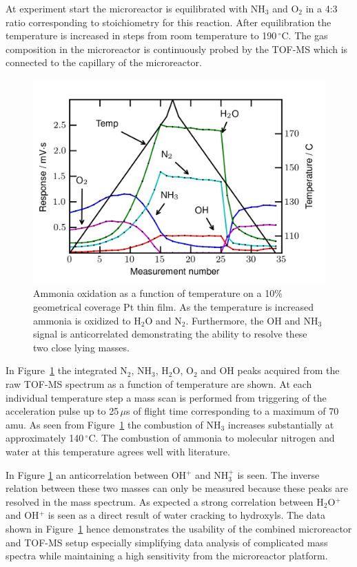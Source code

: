 \documentclass[aip,rsi]{revtex4-1}
\begin{document}
At experiment start the microreactor is equilibrated with NH$_3$ and O$_2$ in a 4:3 ratio corresponding to stoichiometry for this reaction. After equilibration the temperature is increased in steps from room temperature to 190\,$^{\circ}$C. The gas composition in the microreactor is continuously probed by the TOF-MS which is connected to the capillary of the microreactor.
\begin{figure}
 \includegraphics[width=14cm]{ammonia_reactivity.png}%
 \caption{Ammonia oxidation as a function of temperature on a 10\% geometrical coverage Pt thin film. As the temperature is increased ammonia is oxidized to H$_2$O and N$_2$. Furthermore, the OH and NH$_3$ signal is anticorrelated demonstrating the ability to resolve these two close lying masses.\label{fig:ammonia_reactivity}}%
\end{figure}
In Figure~\ref{fig:ammonia_reactivity} the integrated N$_2$, NH$_3$, H$_2$O, O$_2$ and OH peaks acquired from the raw TOF-MS spectrum as a function of temperature are shown. At each individual temperature step a mass scan is performed from triggering of the acceleration pulse up to 25\,$\mu$s of flight time corresponding to a maximum of 70 amu. As seen from Figure~\ref{fig:ammonia_reactivity} the combustion of NH$_3$ increases substantially at approximately 140\,$^{\circ}$C. The combustion of ammonia to molecular nitrogen and water at this temperature agrees well with literature\cite{Imbihl2007,Zeng2009}. 

In Figure \ref{fig:ammonia_reactivity} an anticorrelation between OH$^{+}$ and NH$_3^+$ is seen. The inverse relation between these two masses can only be measured because these peaks are resolved in the mass spectrum. As expected a strong correlation between H$_2$O$^{+}$ and OH$^+$ is seen as a direct result of water cracking to hydroxyls. The data shown in Figure~\ref{fig:ammonia_reactivity} hence demonstrates the usability of the combined microreactor and TOF-MS setup especially simplifying data analysis of complicated mass spectra while maintaining a high sensitivity from the microreactor platform.
\end{document}
